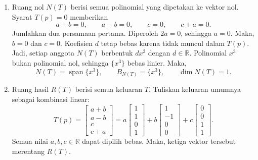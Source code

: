 \documentclass[11pt,a4paper]{article}
\newcommand{\R}{\mathbb{R}}
\newcommand{\Span}{\operatorname{span}}
\begin{document}
\begin{enumerate}[itemsep=12pt,parsep=5pt]
\begin{enumerate}
          \item Ruang nol $N(T)$ berisi semua polinomial yang dipetakan ke vektor nol.
                Syarat $T(p)=0$ memberikan
                \[
                  a+b=0,\qquad a-b=0,\qquad c=0,\qquad c+a=0.
                \]
                Jumlahkan dua persamaan pertama.
                Diperoleh $2a=0$, sehingga $a=0$.
                Maka, $b=0$ dan $c=0$.
                Koefisien $d$ tetap bebas karena tidak muncul dalam $T(p)$.
                Jadi, setiap anggota $N(T)$ berbentuk $dx^3$ dengan $d\in\R$.
                Polinomial $x^3$ bukan polinomial nol, sehingga $\{x^3\}$ bebas linier.
                Maka,
                \[
                  N(T)=\Span\{x^3\},\qquad B_{N(T)}=\{x^3\},\qquad\dim N(T)=1.
                \]

          \item Ruang hasil $R(T)$ berisi semua keluaran $T$.
                Tuliskan keluaran umumnya sebagai kombinasi linear:
                \[
                  T(p)=\begin{bmatrix}a+b\\a-b\\c\\c+a\end{bmatrix}
                  =a\begin{bmatrix}1\\1\\0\\1\end{bmatrix}
                  +b\begin{bmatrix}1\\-1\\0\\0\end{bmatrix}
                  +c\begin{bmatrix}0\\0\\1\\1\end{bmatrix}.
                \]
                Semua nilai $a,b,c\in\R$ dapat dipilih bebas.
                Maka, ketiga vektor tersebut merentang $R(T)$.


\end{enumerate}
\end{enumerate}
\end{document}
